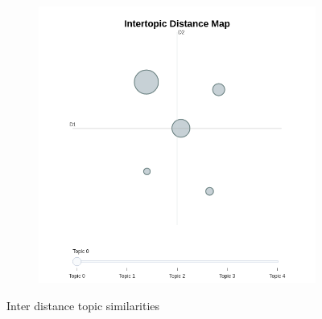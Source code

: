 \documentclass[sn-mathphys,Numbered]{sn-jnl}%
\theoremstyle{thmstyleone}%
\theoremstyle{thmstyletwo}%
\theoremstyle{thmstylethree}%
\begin{document}
\begin{figure}[h!]
\begin{subfigure}{0.45\textwidth}
    \includegraphics[width=\textwidth]{bertopic/combined_bertopic_topics_map_frequency.png}
    \label{Twitterdist}
\end{subfigure}   
\caption{Inter distance topic similarities}
\label{Redditdist_Twitterdist}
\end{figure}
\end{document}
